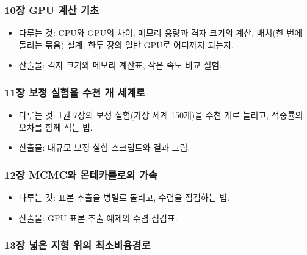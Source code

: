 \documentclass[10pt,a4paper]{article}
\providecommand{\tightlist}{\setlength{\itemsep}{0pt}\setlength{\parskip}{0pt}}
\begin{document}
\hypertarget{uxc7a5-gpu-uxacc4uxc0b0-uxae30uxcd08}{%
\subsubsection{10장 GPU 계산 기초}\label{uxc7a5-gpu-uxacc4uxc0b0-uxae30uxcd08}}

\begin{itemize}
\tightlist
\item
  다루는 것: CPU와 GPU의 차이, 메모리 용량과 격자 크기의 계산, 배치(한 번에 돌리는 묶음) 설계. 한두 장의 일반 GPU로 어디까지 되는지.
\item
  산출물: 격자 크기와 메모리 계산표, 작은 속도 비교 실험.
\end{itemize}

\hypertarget{uxc7a5-uxbcf4uxc815-uxc2e4uxd5d8uxc744-uxc218uxcc9c-uxac1c-uxc138uxacc4uxb85c}{%
\subsubsection{11장 보정 실험을 수천 개 세계로}\label{uxc7a5-uxbcf4uxc815-uxc2e4uxd5d8uxc744-uxc218uxcc9c-uxac1c-uxc138uxacc4uxb85c}}

\begin{itemize}
\tightlist
\item
  다루는 것: 1권 7장의 보정 실험(가상 세계 150개)을 수천 개로 늘리고, 적중률의 오차를 함께 적는 법.
\item
  산출물: 대규모 보정 실험 스크립트와 결과 그림.
\end{itemize}

\hypertarget{uxc7a5-mcmcuxc640-uxbaacuxd14cuxce74uxb97cuxb85cuxc758-uxac00uxc18d}{%
\subsubsection{12장 MCMC와 몬테카를로의 가속}\label{uxc7a5-mcmcuxc640-uxbaacuxd14cuxce74uxb97cuxb85cuxc758-uxac00uxc18d}}

\begin{itemize}
\tightlist
\item
  다루는 것: 표본 추출을 병렬로 돌리고, 수렴을 점검하는 법.
\item
  산출물: GPU 표본 추출 예제와 수렴 점검표.
\end{itemize}

\hypertarget{uxc7a5-uxb113uxc740-uxc9c0uxd615-uxc704uxc758-uxcd5cuxc18cuxbe44uxc6a9uxacbduxb85c}{%
\subsubsection{13장 넓은 지형 위의 최소비용경로}\label{uxc7a5-uxb113uxc740-uxc9c0uxd615-uxc704uxc758-uxcd5cuxc18cuxbe44uxc6a9uxacbduxb85c}}
\end{document}
